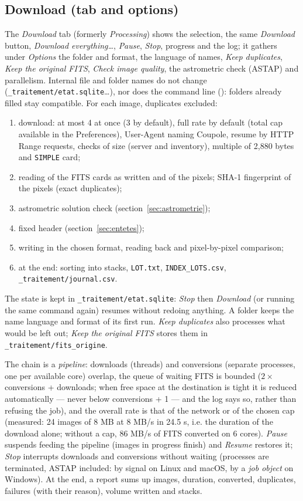 \subsection{Download (tab and options)}
The \emph{Download} tab (formerly \emph{Processing}) shows the selection, the same \emph{Download} button,
\emph{Download everything…}, \emph{Pause}, \emph{Stop}, progress and the log; it gathers under \emph{Options} the
folder and format, the language of names, \emph{Keep duplicates}, \emph{Keep the original FITS}, \emph{Check image
quality}, the astrometric check (ASTAP) and parallelism. Internal file and folder names do not change
(\texttt{\_traitement/etat.sqlite}…), nor does the command line (): folders already filled
stay compatible.
For each image, duplicates excluded:
\begin{enumerate}[leftmargin=*,itemsep=1pt]
\item download: at most 4 at once (3 by default), full rate by default (total cap available in the Preferences), User-Agent naming Coupole,
  resume by HTTP Range requests, checks of size (server and inventory), multiple of 2,880 bytes and \texttt{SIMPLE}
  card;
\item reading of the FITS cards as written and of the pixels; SHA-1 fingerprint of the pixels (exact duplicates);
\item astrometric solution check (section~\ref{sec:astrometrie});
\item fixed header (section~\ref{sec:entetes});
\item writing in the chosen format, reading back and pixel-by-pixel comparison;
\item at the end: sorting into stacks, \texttt{LOT.txt}, \texttt{INDEX\_LOTS.csv}, \texttt{\_traitement/journal.csv}.
\end{enumerate}
The state is kept in \texttt{\_traitement/etat.sqlite}: \emph{Stop} then \emph{Download} (or running the same command
again) resumes without redoing anything. A folder keeps the name language and format of its first run.
\emph{Keep duplicates} also processes what would be left out; \emph{Keep the original FITS} stores them in
\texttt{\_traitement/fits\_origine}.

The chain is a \emph{pipeline}: downloads (threads) and conversions (separate processes, one per available core)
overlap, the queue of waiting FITS is bounded ($2\times$ conversions + downloads; when free space at the destination
is tight it is reduced automatically — never below conversions + 1 — and the log says so, rather than refusing the
job), and the overall rate is that of
the network or of the chosen cap (measured: 24 images of 8 MB at 8 MB/s in 24.5 s, i.e. the duration of the download
alone; without a cap, 86 MB/s of FITS converted on 6 cores). \emph{Pause} suspends feeding the pipeline (images in
progress finish) and \emph{Resume} restores it; \emph{Stop} interrupts downloads and conversions without waiting
(processes are terminated, ASTAP included: by signal on Linux and macOS, by a \emph{job object} on Windows). At the end, a report sums up images, duration, converted, duplicates,
failures (with their reason), volume written and stacks.

